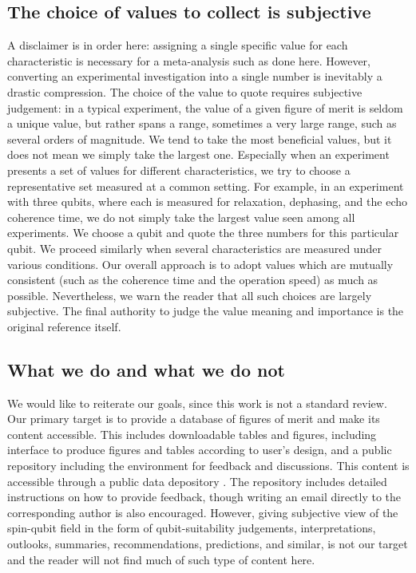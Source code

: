 \documentclass[aps, prx, showpacs, twocolumn, superscriptaddress, notitlepage, longbibliography, floatfix, nofootinbib]{revtex4-2}
\begin{document}
\subsection{The choice of values to collect is subjective}

A disclaimer is in order here: assigning a single specific value for each characteristic is necessary for a meta-analysis such as done here. However, converting an experimental investigation into a single number is inevitably a drastic compression. The choice of the value to quote requires subjective judgement: in a typical experiment, the value of a given figure of merit is seldom a unique value, but rather spans a range, sometimes a very large range, such as several orders of magnitude. We tend to take the most beneficial values, but it does not mean we simply take the largest one. Especially when an experiment presents a set of values for different characteristics, we try to choose a representative set measured at a common setting. For example, in an experiment with three qubits, where each is measured for relaxation, dephasing, and the echo coherence time, we do not simply take the largest value seen among all experiments. We choose a qubit and quote the three numbers for this particular qubit. We proceed similarly when several characteristics are measured under various conditions. Our overall approach is to adopt values which are mutually consistent (such as the coherence time and the operation speed) as much as possible. Nevertheless, we warn the reader that all such choices are largely subjective. The final authority to judge the value meaning and importance is the original reference itself. 

\subsection{What we do and what we do not}

We would like to reiterate our goals, since this work is not a standard review. Our primary target is to provide a database of figures of merit and make its content accessible. This includes downloadable tables and figures, including interface to produce figures and tables according to user's design, and a public repository including the environment for feedback and discussions. This content is accessible through a public data depository \cite{noauthor_notitle_nodate}. The repository includes detailed instructions on how to provide feedback, though writing an email directly to the corresponding author is also encouraged. However, giving subjective view of the spin-qubit field in the form of qubit-suitability judgements, interpretations, outlooks, summaries, recommendations, predictions, and similar, is not our target and the reader will not find much of such type of content here.
\end{document}
